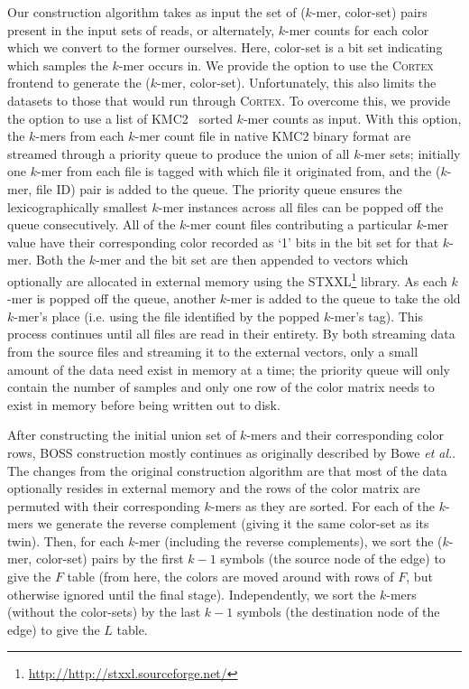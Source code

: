 Our construction algorithm takes as input the set of ($k$-mer, color-set) pairs present in the input sets of reads, or alternately, $k$-mer counts for each color which we convert to the former ourselves.
Here, color-set is a bit set indicating which samples the $k$-mer occurs in.
We provide the option to use the \textsc{Cortex} frontend to generate the ($k$-mer, color-set). Unfortunately, this also limits the datasets to those that would run through \textsc{Cortex}.  To overcome this, we provide the option to use a list of KMC2~\citep{KMC2} sorted $k$-mer counts as input.  With this option, the $k$-mers from each $k$-mer count file in native KMC2 binary format are streamed through a priority queue to produce the union of all $k$-mer sets; initially one $k$-mer from each file is tagged with  which file it originated from, and the ($k$-mer, file ID) pair is added to the queue.   The priority queue ensures the lexicographically smallest $k$-mer instances across all files can be popped off the queue consecutively.  All of the $k$-mer count files contributing a particular $k$-mer value have their corresponding color recorded as `1' bits in the bit set for that $k$-mer.  Both the $k$-mer and the bit set are then appended to vectors which optionally are allocated in external memory using the STXXL\footnote{\url{http://http://stxxl.sourceforge.net/}} library.   As each $k$-mer is popped off the queue, another $k$-mer is added to the queue to take the old $k$-mer's place (i.e. using the file identified by the popped $k$-mer's tag).  This process continues until all files are read in their entirety.  By both streaming data from the source files and streaming it to the external vectors, only a small amount of the data need exist in memory at a time; the priority queue will only contain the number of samples and only one row of the color matrix needs to exist in memory before being written out to disk.


After constructing the initial union set of $k$-mers and their corresponding color rows, BOSS construction mostly continues as originally described by Bowe \emph{et al.}.  The changes from the original construction algorithm are that most of the data optionally resides in external memory and the rows of the color matrix are permuted with their corresponding $k$-mers as they are sorted.  For each of the $k$-mers we generate the reverse complement (giving it the same color-set as its twin). Then, for each $k$-mer (including the reverse complements),
we sort the ($k$-mer, color-set) pairs by the first $k-1$ symbols (the source node of the edge) to give the $F$ table (from here, the colors are moved around with rows of $F$, but otherwise ignored until
the final stage). Independently, we sort the $k$-mers (without the color-sets) by the last $k-1$ symbols (the destination node of the edge) to give the $L$ table.

